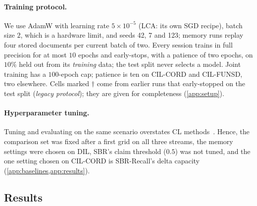 \documentclass[10pt,twocolumn,letterpaper]{article}
\begin{document}
\paragraph{Training protocol.}\label{sec:protocol} We use AdamW with learning rate $5{\times}10^{-5}$ (LCA: its own SGD recipe), batch size $2$, which is a hardware limit, and seeds 42, 7 and 123; memory runs replay four stored documents per current batch of two. Every session trains in full precision for at most $10$ epochs and early-stops, with a patience of two epochs, on $10\%$ held out from its \emph{training} data; the test split never selects a model. Joint training has a $100$-epoch cap; patience is ten on CIL-CORD and CIL-FUNSD, two elsewhere. Cells marked $\dagger$ come from earlier runs that early-stopped on the test split (\emph{legacy protocol}); they are given for completeness (\cref{app:setup}).

\paragraph{Hyperparameter tuning.} Tuning and evaluating on the same scenario overstates CL methods~\citep{cha2025hyperparameters}. Hence, the comparison set was fixed after a first grid on all three streams, the memory settings were chosen on DIL, SBR's claim threshold ($0.5$) was not tuned, and the one setting chosen on CIL-CORD is SBR-Recall's delta capacity (\cref{app:baselines,app:results}).

\begin{table}[t]
\centering\small
\setlength{\tabcolsep}{4pt}
\caption{\textbf{Comparison with continual-learning baselines} on LayoutLMv3 over six streams. F1: full-label F1; AA and AF: average accuracy and forgetting (\cref{sec:setup}). AA and F1: mean $\pm$ s.d. over three seeds, per-seed values when fewer; AF: mean; ``--'': not run. Bold: best of each column, Joint training aside; underlined: our best when a baseline is best. $^\dagger$legacy protocol; $^{n=k}$: $k$ clean seeds so far; $^{b}$with the $50$-document memory; on CIL-WildReceipt and DIL-XFUND, ER keeps $200$ documents and DER++ $250$; on CIL-FUNSD both keep $20$, the memory of the CoLaR cells there; Ports and protocols: \cref{app:baselines}; what each method stores: \cref{tab:memcmp}.}
\label{tab:main}
\resizebox{\linewidth}{!}{}
\end{table}

\subsection{Results}
\label{sec:beyond}
\end{document}
